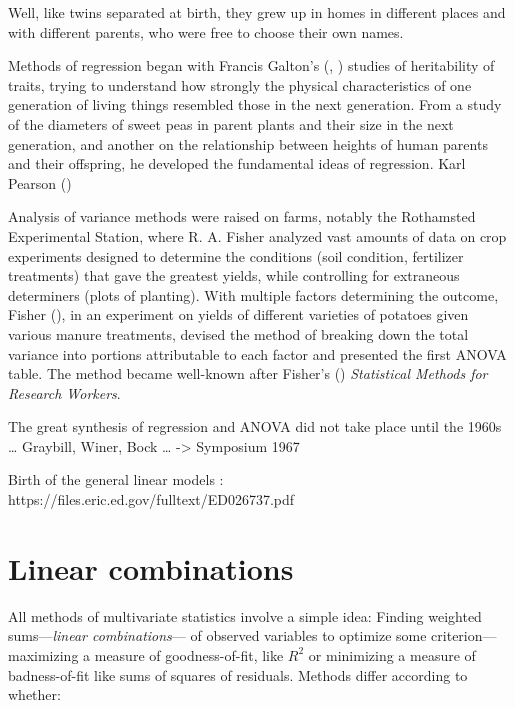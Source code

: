 \documentclass[
  letterpaper,
  10pt,
  krantz2]{krantz}
\begin{document}
{\begin{tcolorbox}
Well, like twins separated at birth, they grew up in homes in different
places and with different parents, who were free to choose their own
names.

Methods of regression began with Francis Galton's
(, )
studies of heritability of traits, trying to understand how strongly the
physical characteristics of one generation of living things resembled
those in the next generation. From a study of the diameters of sweet
peas in parent plants and their size in the next generation, and another
on the relationship between heights of human parents and their
offspring, he developed the fundamental ideas of regression. Karl
Pearson ()

Analysis of variance methods were raised on farms, notably the
Rothamsted Experimental Station, where R. A. Fisher analyzed vast
amounts of data on crop experiments designed to determine the conditions
(soil condition, fertilizer treatments) that gave the greatest yields,
while controlling for extraneous determiners (plots of planting). With
multiple factors determining the outcome, Fisher
(), in an experiment on yields of
different varieties of potatoes given various manure treatments, devised
the method of breaking down the total variance into portions
attributable to each factor and presented the first ANOVA table. The
method became well-known after Fisher's
() \emph{Statistical Methods for Research
Workers}.

The great synthesis of regression and ANOVA did not take place until the
1960s \ldots{} Graybill, Winer, Bock \ldots{} -\textgreater{} Symposium
1967

Birth of the general linear models :
https://files.eric.ed.gov/fulltext/ED026737.pdf

\end{tcolorbox}

\section{Linear combinations}\label{linear-combinations}

All methods of multivariate statistics involve a simple idea: Finding
weighted sums---\emph{linear combinations}--- of observed variables to
optimize some criterion---maximizing a measure of goodness-of-fit, like
\(R^2\) or minimizing a measure of badness-of-fit like sums of squares
of residuals. Methods differ according to whether:

}
\end{document}
